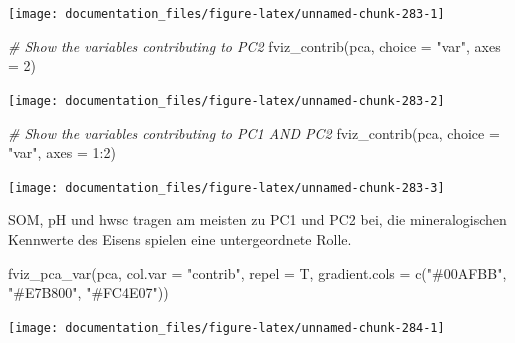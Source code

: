 \documentclass[
]{article}
\newenvironment{Shaded}{\begin{snugshade}}{\end{snugshade}}
\newcommand{\AttributeTok}[1]{\textcolor[rgb]{0.77,0.63,0.00}{#1}}
\newcommand{\CommentTok}[1]{\textcolor[rgb]{0.56,0.35,0.01}{\textit{#1}}}
\newcommand{\DecValTok}[1]{\textcolor[rgb]{0.00,0.00,0.81}{#1}}
\newcommand{\FunctionTok}[1]{\textcolor[rgb]{0.00,0.00,0.00}{#1}}
\newcommand{\NormalTok}[1]{#1}
\newcommand{\SpecialCharTok}[1]{\textcolor[rgb]{0.00,0.00,0.00}{#1}}
\newcommand{\StringTok}[1]{\textcolor[rgb]{0.31,0.60,0.02}{#1}}
\begin{document}
\begin{center}\texttt{[image: documentation\_files/figure-latex/unnamed-chunk-283-1]} \end{center}

\begin{Shaded}
\begin{Highlighting}[]
\CommentTok{\# Show the variables contributing to PC2}
\FunctionTok{fviz\_contrib}\NormalTok{(pca, }\AttributeTok{choice =} \StringTok{"var"}\NormalTok{, }\AttributeTok{axes =} \DecValTok{2}\NormalTok{)}
\end{Highlighting}
\end{Shaded}

\begin{center}\texttt{[image: documentation\_files/figure-latex/unnamed-chunk-283-2]} \end{center}

\begin{Shaded}
\begin{Highlighting}[]
\CommentTok{\# Show the variables contributing to PC1 AND PC2}
\FunctionTok{fviz\_contrib}\NormalTok{(pca, }\AttributeTok{choice =} \StringTok{"var"}\NormalTok{, }\AttributeTok{axes =} \DecValTok{1}\SpecialCharTok{:}\DecValTok{2}\NormalTok{)}
\end{Highlighting}
\end{Shaded}

\begin{center}\texttt{[image: documentation\_files/figure-latex/unnamed-chunk-283-3]} \end{center}

SOM, pH und hwsc tragen am meisten zu PC1 und PC2 bei, die mineralogischen Kennwerte des Eisens spielen eine untergeordnete Rolle.

\begin{Shaded}
\begin{Highlighting}[]
\FunctionTok{fviz\_pca\_var}\NormalTok{(pca, }\AttributeTok{col.var =} \StringTok{"contrib"}\NormalTok{, }\AttributeTok{repel =}\NormalTok{ T, }\AttributeTok{gradient.cols =} \FunctionTok{c}\NormalTok{(}\StringTok{"\#00AFBB"}\NormalTok{, }\StringTok{"\#E7B800"}\NormalTok{, }\StringTok{"\#FC4E07"}\NormalTok{))}
\end{Highlighting}
\end{Shaded}

\begin{center}\texttt{[image: documentation\_files/figure-latex/unnamed-chunk-284-1]} \end{center}
\end{document}
